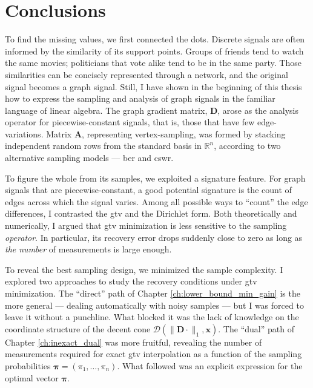 \chapter{Conclusions}


To find the missing values, we first connected the dots. Discrete signals are often informed by the similarity of its support points. Groups of friends tend to watch the same movies; politicians that vote alike tend to be in the same party. Those similarities can be concisely represented through a network, and the original signal becomes a graph signal. Still, I have shown in the beginning of this thesis how to express the sampling and analysis of graph signals in the familiar language of linear algebra. The graph gradient matrix, $\mathbf{D}$, arose as the analysis operator for piecewise-constant signals, that is, those that have few edge-variations. Matrix $\mathbf{A}$, representing vertex-sampling, was formed by stacking independent random rows from the standard basis in $\mathbb{R}^{n}$, according to two alternative sampling models --- \acrshort{ber} and \acrshort{cswr}.

To figure the whole from its samples, we exploited a signature feature. For graph signals that are piecewise-constant, a good potential signature is the count of edges across which the signal varies. Among all possible ways to ``count'' the edge differences, I contrasted the \acrfull{gtv} and the Dirichlet form. Both theoretically and numerically, I argued that \acrshort{gtv} minimization is less sensitive to the sampling \emph{operator}. In particular, its recovery error drops suddenly close to zero as long as \emph{the number} of measurements is large enough.

To reveal the best sampling design, we minimized the sample complexity. I explored two approaches to study the recovery conditions under \acrshort{gtv} minimization. The ``direct'' path of Chapter \ref{ch:lower_bound_min_gain} is the more general --- dealing automatically with noisy samples --- but I was forced to leave it without a punchline. What blocked it was the lack of knowledge on the coordinate structure of the decent cone $\mathcal{D} \left ( \|\mathbf{D} \cdot\|_1 , \mathbf{x} \right )$. The ``dual'' path of Chapter \ref{ch:inexact_dual} was more fruitful, revealing the number of measurements required for exact \acrshort{gtv} interpolation as a function of the sampling probabilities $\bm{\pi} =(\pi_1, \dots, \pi_n)$. What followed was an explicit expression for the optimal vector $\bm{\pi}$.


